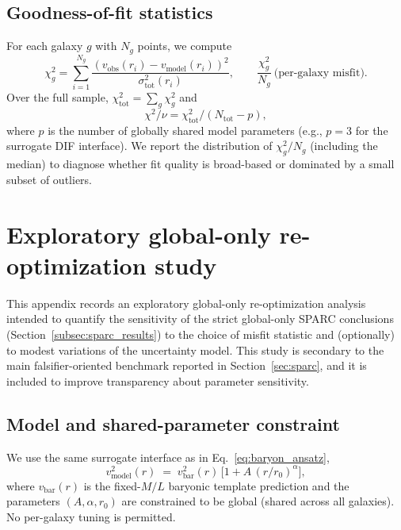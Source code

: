 \documentclass[entropy,article,submit,pdftex,moreauthors]{Definitions/mdpi}
\begin{document}
\subsection{Goodness-of-fit statistics}
For each galaxy \(g\) with \(N_g\) points, we compute
\begin{equation}
\chi^2_g = \sum_{i=1}^{N_g}\frac{(v_{\mathrm{obs}}(r_i)-v_{\mathrm{model}}(r_i))^2}{\sigma^2_{\mathrm{tot}}(r_i)},
\qquad
\frac{\chi^2_g}{N_g}\ \text{(per-galaxy misfit)}.
\tag{D.5}
\end{equation}
Over the full sample, \(\chi^2_{\mathrm{tot}}=\sum_g\chi^2_g\) and
\begin{equation}
\chi^2/\nu = \chi^2_{\mathrm{tot}}/(N_{\mathrm{tot}}-p),
\tag{D.6}
\end{equation}
where \(p\) is the number of globally shared model parameters (e.g., \(p=3\) for the surrogate DIF interface).
We report the distribution of \(\chi^2_g/N_g\) (including the median) to diagnose whether fit quality is broad-based
or dominated by a small subset of outliers.

\section[\appendixname~\thesection]{Exploratory global-only re-optimization study}
\label{app:reopt}

This appendix records an exploratory global-only re-optimization analysis intended to quantify the sensitivity of the strict global-only SPARC conclusions (Section~\ref{subsec:sparc_results}) to the choice of misfit statistic and (optionally) to modest variations of the uncertainty model. This study is secondary to the main falsifier-oriented benchmark reported in Section~\ref{sec:sparc}, and it is included to improve transparency about parameter sensitivity.

\subsection{Model and shared-parameter constraint}
We use the same surrogate interface as in Eq.~\ref{eq:baryon_ansatz},
\begin{equation}
v^2_{\mathrm{model}}(r) \;=\; v^2_{\mathrm{bar}}(r)\,\Big[1 + A\,(r/r_0)^{\alpha}\Big],
\tag{E.1}
\end{equation}
where \(v_{\mathrm{bar}}(r)\) is the fixed-\(M/L\) baryonic template prediction and the parameters
\((A,\alpha,r_0)\) are constrained to be global (shared across all galaxies). No per-galaxy tuning
is permitted.
\end{document}
